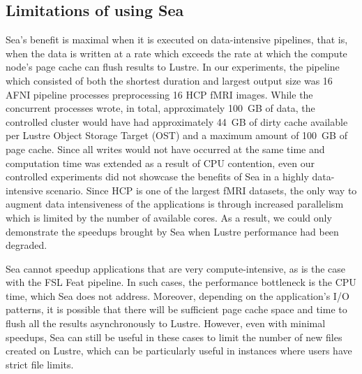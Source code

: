 \documentclass[fleqn,10pt]{wlscirep}
\begin{document}
    \subsection{Limitations of using Sea}
    
    Sea's benefit is maximal when it is executed on data-intensive pipelines, that is,
     when the data is written at a rate which exceeds the rate at which the
    compute node's page cache can flush results to Lustre. In our experiments,
    the pipeline which consisted of both the shortest duration and largest
    output size was 16 AFNI pipeline processes preprocessing 16 HCP fMRI images. While the concurrent processes wrote, in total,
    approximately 100~GB of data, the controlled cluster would have had
    approximately 44~GB of dirty cache available per Lustre Object Storage Target (OST) and a maximum amount of
    100~GB of page cache. Since all writes would not have occurred at the same
    time and computation time was extended as a result of CPU contention, even
    our controlled experiments did not showcase the benefits of Sea in a highly
    data-intensive scenario. Since HCP is one of the largest fMRI datasets,
    the only way to augment data intensiveness of the applications is
    through increased parallelism which is limited by the number of available
    cores. As a result, we could only demonstrate the speedups brought by Sea when
    Lustre performance had been degraded.


    Sea cannot speedup applications that are very compute-intensive, as is the case with the FSL Feat pipeline.
    In such cases, the performance bottleneck is the
    CPU time, which Sea does not address. Moreover, depending on the
    application's I/O patterns, it is possible that there will be sufficient
    page cache space and time to flush all the results asynchronously
    to Lustre. However, even with minimal speedups, Sea can still be useful in
    these cases to limit the number of new files created on Lustre, which can be
    particularly useful in instances where users have strict file limits.


\end{document}

